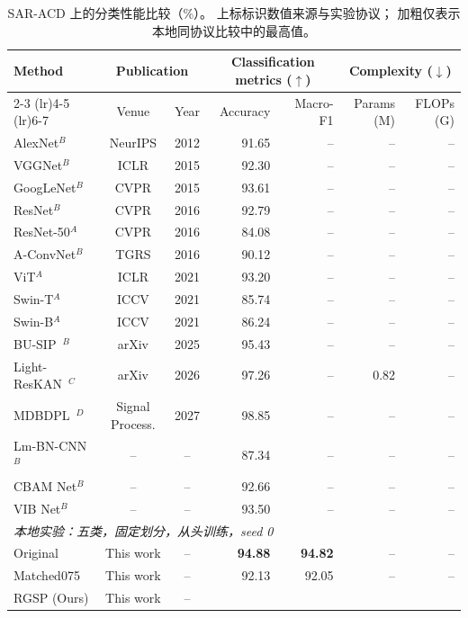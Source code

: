 \begin{table}[!t]
\centering
\small
\setlength{\tabcolsep}{4pt}
\renewcommand{\arraystretch}{1.10}
\caption{SAR-ACD 上的分类性能比较（\%）。
上标标识数值来源与实验协议；
加粗仅表示本地同协议比较中的最高值。}
\label{tab:saracd_performance}
\begin{tabular*}{\textwidth}{@{\extracolsep{\fill}}lccrrrr}
\toprule
\multirow{2}{*}{Method}
& \multicolumn{2}{c}{Publication}
& \multicolumn{2}{c}{Classification metrics ($\uparrow$)}
& \multicolumn{2}{c}{Complexity ($\downarrow$)} \\
\cmidrule(lr){2-3}
\cmidrule(lr){4-5}
\cmidrule(lr){6-7}
& Venue & Year
& Accuracy & Macro-F1
& Params (M) & FLOPs (G) \\
\midrule
AlexNet$^{B}$
& NeurIPS & 2012
& 91.65 & -- & -- & -- \\
VGGNet$^{B}$
& ICLR & 2015
& 92.30 & -- & -- & -- \\
GoogLeNet$^{B}$
& CVPR & 2015
& 93.61 & -- & -- & -- \\
ResNet$^{B}$
& CVPR & 2016
& 92.79 & -- & -- & -- \\
ResNet-50$^{A}$
& CVPR & 2016
& 84.08 & -- & -- & -- \\
A-ConvNet$^{B}$
& TGRS & 2016
& 90.12 & -- & -- & -- \\
ViT$^{A}$
& ICLR & 2021
& 93.20 & -- & -- & -- \\
Swin-T$^{A}$
& ICCV & 2021
& 85.74 & -- & -- & -- \\
Swin-B$^{A}$
& ICCV & 2021
& 86.24 & -- & -- & -- \\
BU-SIP~\cite{busip2025}$^{B}$
& arXiv & 2025
& 95.43 & -- & -- & -- \\
Light-ResKAN~\cite{lightreskan2026}$^{C}$
& arXiv & 2026
& 97.26 & -- & 0.82 & -- \\
MDBDPL~\cite{mdbdpl2027}$^{D}$
& Signal Process. & 2027
& 98.85 & -- & -- & -- \\
Lm-BN-CNN$^{B}$
& -- & --
& 87.34 & -- & -- & -- \\
CBAM Net$^{B}$
& -- & --
& 92.66 & -- & -- & -- \\
VIB Net$^{B}$
& -- & --
& 93.50 & -- & -- & -- \\
\midrule
\multicolumn{7}{l}{
\textit{本地实验：五类，固定划分，从头训练，seed 0}} \\
Original
& This work & --
& \textbf{94.88} & \textbf{94.82} & -- & -- \\
Matched075
& This work & --
& 92.13 & 92.05 & -- & -- \\
RGSP (Ours)
& This work & --

\end{tabular*}
\end{table}
